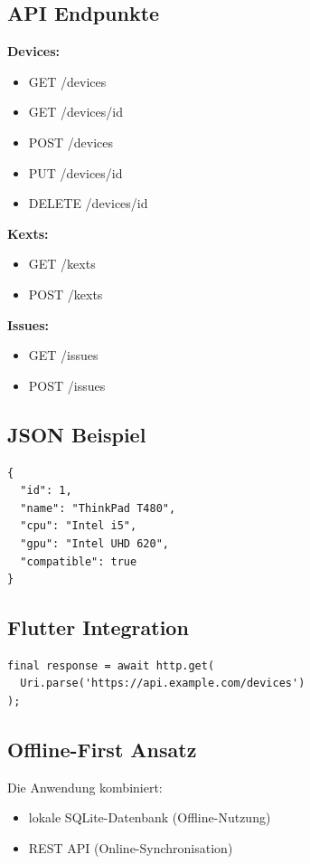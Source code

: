 \documentclass[a4paper,12pt]{article}
\begin{document}
\subsection{API Endpunkte}

\textbf{Devices:}
\begin{itemize}
\item GET /devices
\item GET /devices/{id}
\item POST /devices
\item PUT /devices/{id}
\item DELETE /devices/{id}
\end{itemize}

\textbf{Kexts:}
\begin{itemize}
\item GET /kexts
\item POST /kexts
\end{itemize}

\textbf{Issues:}
\begin{itemize}
\item GET /issues
\item POST /issues
\end{itemize}

\subsection{JSON Beispiel}
\begin{verbatim}
{
  "id": 1,
  "name": "ThinkPad T480",
  "cpu": "Intel i5",
  "gpu": "Intel UHD 620",
  "compatible": true
}
\end{verbatim}

\subsection{Flutter Integration}
\begin{verbatim}
final response = await http.get(
  Uri.parse('https://api.example.com/devices')
);
\end{verbatim}

\subsection{Offline-First Ansatz}
Die Anwendung kombiniert:
\begin{itemize}
\item lokale SQLite-Datenbank (Offline-Nutzung)
\item REST API (Online-Synchronisation)
\end{itemize}
\end{document}
